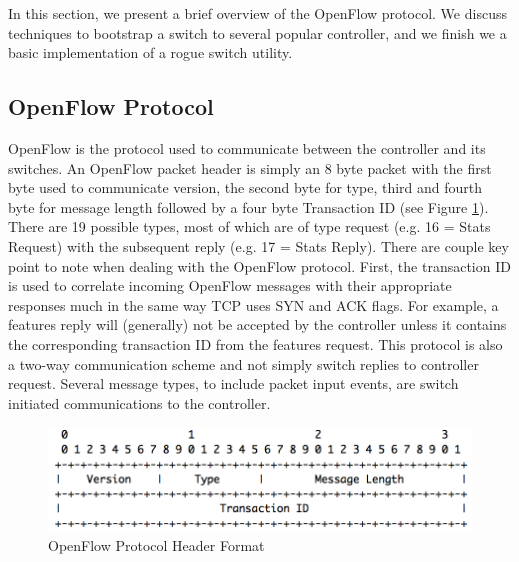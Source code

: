 In this section, we present a brief overview of the OpenFlow protocol. We discuss techniques to bootstrap a switch to several popular controller, and we finish we a basic implementation of a rogue switch utility. 

\subsection {OpenFlow Protocol}
OpenFlow is the protocol used to communicate between the controller and its switches. An OpenFlow packet header is simply an 8 byte packet with the first byte used to communicate version, the second byte for type, third and fourth byte for message length followed by a four byte Transaction ID (see Figure \ref{fig:protocol}). There are 19 possible types, most of which are of type request (e.g. 16 = Stats Request) with the subsequent reply (e.g. 17 = Stats Reply). There are couple key point to note when dealing with the OpenFlow protocol. First, the transaction ID is used to correlate incoming OpenFlow messages with their appropriate responses much in the same way TCP uses SYN and ACK flags. For example, a features reply will (generally) not be accepted by the controller unless it contains the corresponding transaction ID from the features request. This protocol is also a two-way communication scheme and not simply switch replies to controller request. Several message types, to include packet input events, are switch initiated communications to the controller.  

\begin{figure}
  \includegraphics[width=\linewidth]{openflowProtocol.png}
  \caption{OpenFlow Protocol Header Format \cite{protocol}}
  \label{fig:protocol}
\end{figure}

